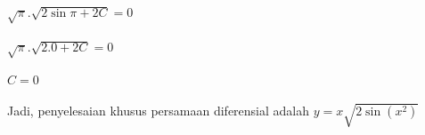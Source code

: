 \begin{enumerate}[1.]
	\begin{math} \sqrt{\pi} . \sqrt{2 \sin \pi + 2C} = 0 \end{math} \\ \\
	\begin{math} \sqrt{\pi} . \sqrt{2 . 0+ 2C} = 0 \end{math} \\ \\
	\begin{math} C = 0 \end{math} \\ \\
	Jadi, penyelesaian khusus persamaan diferensial adalah \begin{math} y = x \sqrt{2 \sin(x^{2})} \end{math}


\end{enumerate}
